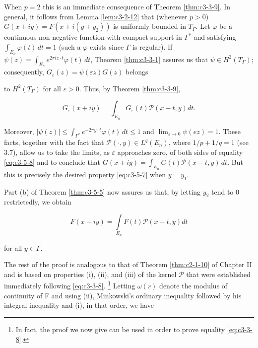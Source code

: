 When $p = 2$ this is an immediate consequence of Theorem \ref{thm:c3-3-9}. In general, it follows from Lemma \ref{lem:c3-2-12} that (whenever $p > 0$) $G(x + iy) = F(x + i(y + y_2))$ is uniformly bounded in $T_\Gamma$. Let $\varphi$ be a continuous non-negative function with compact support in $\Gamma^*$ and satisfying $\int_{E_n} \varphi(t) \, dt = 1$ (such a $\varphi$ exists since $\Gamma$ is regular). If $\psi(z) = \int_{E_n} e^{2\pi i z \cdot t} \varphi(t) \, dt$, Theorem \ref{thm:c3-3-1} assures us that $\psi \in H^2(T_\Gamma)$; consequently, $G_\varepsilon(z) = \psi(\varepsilon z)G(z)$ belongs

to $H^{2}(T_{\Gamma})$ for all $\varepsilon > 0$. Thus, by Theorem \ref{thm:c3-3-9},

\begin{equation}\label{eq:c3-5-8}
G_{\varepsilon}(x+i y)=\int_{E_{n}}G_{\varepsilon}(t)\mathcal{P}(x-t,y)d t.
\end{equation}

Moreover, $|\psi(z)| \leq \int_{\Gamma^*} e^{-2\pi y \cdot t} \varphi(t) \, dt \leq 1$ and $\lim_{\varepsilon \to 0} \psi(e z) = 1$. These facts, together with the fact that $\mathcal{P}(\cdot, y) \in L^q(E_n)$, where $1/p + 1/q = 1$ (see 3.7), allow us to take the limits, as $\varepsilon$ approaches zero, of both sides of equality \eqref{eq:c3-5-8} and to conclude that $G(x + iy) = \int_{E_n} G(t)\mathcal{P}(x - t, y) \, dt$. But this is precisely the desired property \eqref{eq:c3-5-7} when $y = y_1$.

Part (b) of Theorem \ref{thm:c3-5-5} now assures us that, by letting $y_{2}$ tend to 0 restrictedly, we obtain

\begin{equation}\label{eq:c3-5-9}
F(x+i y)=\int\limits_{E_{n}}F(t)\mathcal{P}(x-t,y)d t
\end{equation}

for all $y \in \Gamma$.

The rest of the proof is analogous to that of Theorem \ref{thm:c2-1-10} of Chapter II and is based on properties (i), (ii), and (iii) of the kernel $\mathcal{P}$ that were established immediately following \eqref{eq:c3-3-8}. \footnote{In fact, the proof we now give can be used in order to prove equality \eqref{eq:c3-3-8}.} Letting $\omega(r)$ denote the modulus of continuity of F and using (ii), Minkowski's ordinary inequality followed by his integral inequality and (i), in that order, we have

